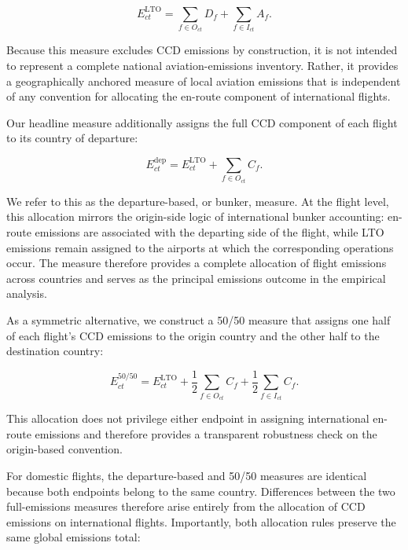 \documentclass[12pt]{extarticle}
\begin{document}
\begin{equation}
E^{\mathrm{LTO}}_{ct}
=
\sum_{f\in O_{ct}}D_f
+
\sum_{f\in I_{ct}}A_f .
\label{eq:nature_5}
\end{equation}

Because this measure excludes CCD emissions by construction, it is not intended to represent a complete national aviation-emissions inventory. Rather, it provides a geographically anchored measure of local aviation emissions that is independent of any convention for allocating the en-route component of international flights.

Our headline measure additionally assigns the full CCD component of each flight to its country of departure:

\begin{equation}
E^{\mathrm{dep}}_{ct}
=
E^{\mathrm{LTO}}_{ct}
+
\sum_{f\in O_{ct}} C_f .
\label{eq:nature_6}
\end{equation}

We refer to this as the departure-based, or bunker, measure. At the flight level, this allocation mirrors the origin-side logic of international bunker accounting: en-route emissions are associated with the departing side of the flight, while LTO emissions remain assigned to the airports at which the corresponding operations occur. The measure therefore provides a complete allocation of flight emissions across countries and serves as the principal emissions outcome in the empirical analysis.

As a symmetric alternative, we construct a 50/50 measure that assigns one half of each flight's CCD emissions to the origin country and the other half to the destination country:

\begin{equation}
E^{50/50}_{ct}
=
E^{\mathrm{LTO}}_{ct}
+
\frac{1}{2}\sum_{f\in O_{ct}} C_f
+
\frac{1}{2}\sum_{f\in I_{ct}} C_f .
\label{eq:nature_7}
\end{equation}

This allocation does not privilege either endpoint in assigning international en-route emissions and therefore provides a transparent robustness check on the origin-based convention.

For domestic flights, the departure-based and 50/50 measures are identical because both endpoints belong to the same country. Differences between the two full-emissions measures therefore arise entirely from the allocation of CCD emissions on international flights. Importantly, both allocation rules preserve the same global emissions total:
\end{document}
